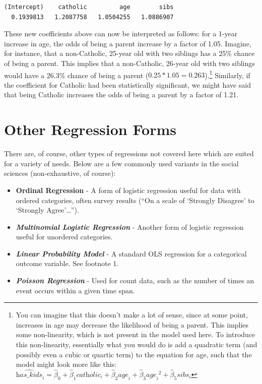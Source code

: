 \documentclass[
  letterpaper,
]{book}
\providecommand{\tightlist}{%
  \setlength{\itemsep}{0pt}\setlength{\parskip}{0pt}}\usepackage{longtable,booktabs,array}
\begin{document}
\begin{verbatim}
(Intercept)    catholic         age        sibs 
  0.1939813   1.2087758   1.0504255   1.0886907 
\end{verbatim}

These new coefficients above can now be interpreted as follows: for a
1-year increase in age, the odds of being a parent increase by a factor
of 1.05. Imagine, for instance, that a non-Catholic, 25-year old with
two siblings has a 25\% chance of being a parent. This implies that a
non-Catholic, 26-year old with two siblings would have a 26.3\% chance
of being a parent (\(0.25 * 1.05 = 0.263\)).\footnote{You can imagine
  that this doesn't make a lot of sense, since at some point, increases
  in age may decrease the likelihood of being a parent. This implies
  some non-linearity, which is not present in the model used here. To
  introduce this non-linearity, essentially what you would do is add a
  quadratic term (and possibly even a cubic or quartic term) to the
  equation for age, such that the model might look more like this:
  \(\widehat{\textit{has\_kids}}_{i} = \hat{\beta}_{0} +\hat{\beta}_{1}\textit{catholic}_{i} + \hat{\beta}_{2}{\textit{age}}_{i} + \hat{\beta}_{3}{\textit{age}_{i}}^2 + \hat{\beta}_{5}\textit{sibs}_{i}\)}
Similarly, if the coefficient for Catholic had been statistically
significant, we might have said that being Catholic increases the odds
of being a parent by a factor of 1.21.

\hypertarget{other-regression-forms}{%
\section{Other Regression Forms}\label{other-regression-forms}}

There are, of course, other types of regressions not covered here which
are suited for a variety of needs. Below are a few commonly used
variants in the social sciences (non-exhaustive, of course):

\begin{itemize}
\tightlist
\item
  \textbf{Ordinal Regression} - A form of logistic regression useful for
  data with ordered categories, often survey results (``On a scale of
  `Strongly Disagree' to `Strongly Agree'\ldots{}'').
\item
  \textbf{\emph{Multinomial Logistic Regression}} - Another form of
  logistic regression useful for unordered categories.
\item
  \textbf{\emph{Linear Probability Model}} - A standard OLS regression
  for a categorical outcome variable. See footnote 1.
\item
  \textbf{\emph{Poisson Regression}} - Used for count data, such as the
  number of times an event occurs within a given time span.
\end{itemize}
\end{document}
